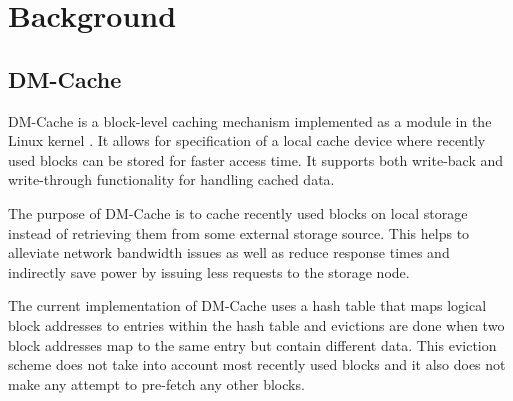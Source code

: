 \section{Background}

\subsection{DM-Cache}

DM-Cache is a block-level caching mechanism implemented as a module in the Linux
kernel \cite{DM-Cache}. It allows for specification of a local cache device
where recently used blocks can be stored for faster access time. It supports
both write-back and write-through functionality for handling cached data.

The purpose of DM-Cache is to cache recently used blocks on local storage
instead of retrieving them from some external storage source. This helps to
alleviate network bandwidth issues as well as reduce response times and
indirectly save power by issuing less requests to the storage node.

The current implementation of DM-Cache uses a hash table that maps logical block
addresses to entries within the hash table and evictions are done when two block
addresses map to the same entry but contain different data. This eviction scheme
does not take into account most recently used blocks and it also does not make
any attempt to pre-fetch any other blocks.
